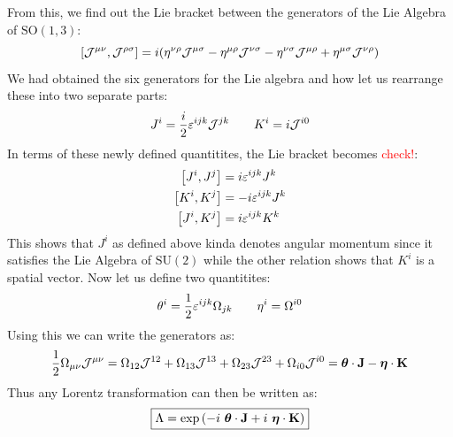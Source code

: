 From this, we find out the Lie bracket between the generators of the Lie Algebra of $\mathrm{SO}(1,3)$:
$$\left[ \mathcal J^{\mu\nu}, \mathcal J^{\rho\sigma} \right] =i \qty(\eta^{\nu\rho}\mathcal J^{\mu\sigma}-\eta^{\mu\rho}\mathcal J^{\nu\sigma}-\eta^{\nu\sigma}\mathcal J^{\mu\rho}+\eta^{\mu\sigma}\mathcal J^{\nu\rho})$$
We had obtained the six generators for the Lie algebra and how let us rearrange these into two separate parts:
$$J^i = \frac{i}{2}\varepsilon^{ijk}\mathcal J^{jk}\qquad K^i = i\mathcal J^{i0}$$
In terms of these newly defined quantitites, the Lie bracket becomes \textcolor{red}{check!}:
\begin{align*}
    \left[ J^i, J^j \right]&=i \varepsilon^{ijk}J^k\\
    \left[ K^i, K^j \right]&=-i \varepsilon^{ijk}J^k\\
    \left[ J^i, K^j \right]&=i \varepsilon^{ijk}K^k
\end{align*}
This shows that $J^i$ as defined above kinda denotes angular momentum since it satisfies the Lie Algebra of $\mathrm{SU}(2)$ while the other relation shows that $K^i$ is a spatial vector. Now let us define two quantitites:
$$\theta^i = \frac{1}{2}\varepsilon^{ijk}\Omega_{jk}\qquad \eta^i = \Omega^{i0}$$
Using this we can write the generators as:
$$\frac{1}{2}\Omega_{\mu\nu}\mathcal J^{\mu\nu} = \Omega_{12}\mathcal J^{12} + \Omega_{13}\mathcal J^{13}+ \Omega_{23}\mathcal J^{23} +  \Omega_{i0}\mathcal J^{i0} = \boldsymbol{\theta}\cdot \vb{J} - \boldsymbol{\eta}\cdot \vb{K}$$
Thus any Lorentz transformation can then be written as:
$$\boxed{\Lambda = \exp\qty(-i\ \bs{\theta}\cdot \vb{J} +i\ \bs{\eta}\cdot \vb{K})}$$